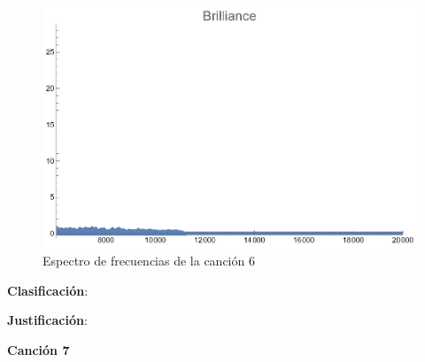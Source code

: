 \documentclass[12pt, letterpaper]{article}
\begin{document}
\begin{figure}[H]
\begin{minipage}{.3\textwidth}
  \end{minipage}
  \begin{minipage}{0.03\textwidth}\end{minipage}
  \begin{minipage}{.3\textwidth}
    \centering
    \includegraphics[width=.9\linewidth]{imgs/Cancion6/brilliance.png}
  \end{minipage}
  \caption{Espectro de frecuencias de la canción 6}
  \label{fig:esp06}
\end{figure}

\textbf{Clasificación}: 

\textbf{Justificación}: 

\newpage

\textbf{\large{Canción 7}}
\end{document}
